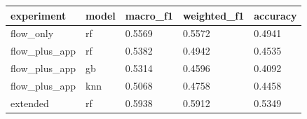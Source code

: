 \begin{tabular}{lllll}
\toprule
   experiment & model & macro\_f1 & weighted\_f1 & accuracy \\
\midrule
    flow\_only &    rf &   0.5569 &      0.5572 &   0.4941 \\
flow\_plus\_app &    rf &   0.5382 &      0.4942 &   0.4535 \\
flow\_plus\_app &    gb &   0.5314 &      0.4596 &   0.4092 \\
flow\_plus\_app &   knn &   0.5068 &      0.4758 &   0.4458 \\
     extended &    rf &   0.5938 &      0.5912 &   0.5349 \\
\bottomrule
\end{tabular}
